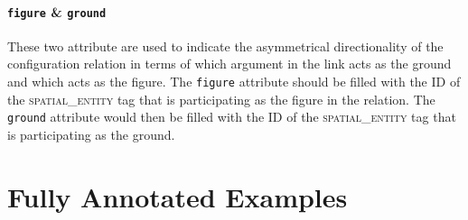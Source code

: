 \documentclass[11pt]{article}
\begin{document}


\paragraph{\texttt{figure} \& \texttt{ground}} %
\label{par:figure_ground}
These two attribute are used to indicate the asymmetrical directionality of the configuration relation in terms of which argument in the link acts as the ground and which acts as the figure. The \texttt{figure} attribute should be filled with the ID of the \textsc{spatial\_entity} tag that is participating as the figure in the relation. The \texttt{ground} attribute would then be filled with the ID of the \textsc{spatial\_entity} tag that is participating as the ground.






\section{Fully Annotated Examples} %
\label{sec:fully_annotated_examples}


\end{document}
